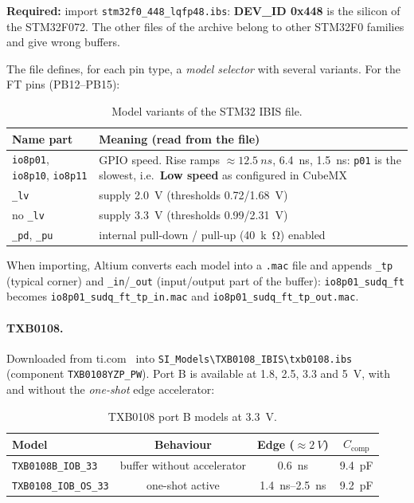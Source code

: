 \documentclass[11pt,a4paper]{article}
\newcommand{\required}[1]{\begin{reqbox}\textbf{\color{reqred}Required:} #1\end{reqbox}}
\begin{document}
\required{import \texttt{stm32f0\_448\_lqfp48.ibs}: \textbf{DEV\_ID 0x448} is the silicon of the
STM32F072. The other files of the archive belong to other STM32F0 families and give
wrong buffers.}

The file defines, for each pin type, a \textit{model selector} with several variants. For the FT pins
(PB12--PB15):

\begin{table}[H]
\centering
\begin{tabular}{l>{\raggedright\arraybackslash}p{}}
\toprule
Name part & Meaning (read from the file) \\
\midrule
\texttt{io8p01}, \texttt{io8p10}, \texttt{io8p11} & GPIO speed. Rise ramps $\approx\qty{12.5}{ns}$, \qty{6.4}{ns}, \qty{1.5}{ns}: \texttt{p01} is the slowest,
i.e.\ \textbf{Low speed} as configured in CubeMX \\
\texttt{\_lv} & supply \qty{2.0}{V} (thresholds 0.72/\qty{1.68}{V}) \\
no \texttt{\_lv} & supply \qty{3.3}{V} (thresholds 0.99/\qty{2.31}{V}) \\
\texttt{\_pd}, \texttt{\_pu} & internal pull-down / pull-up (\qty{40}{k\ohm}) enabled \\
\bottomrule
\end{tabular}
\caption{Model variants of the STM32 IBIS file.}
\label{tab:variants}
\end{table}

{\sloppy When importing, Altium converts each model into a \texttt{.mac} file and appends \texttt{\_tp} (typical
corner) and \texttt{\_in}/\texttt{\_out} (input/output part of the buffer): \texttt{io8p01\_sudq\_ft} becomes
\texttt{io8p01\_sudq\_ft\_tp\_in.mac} and \texttt{io8p01\_sudq\_ft\_tp\_out.mac}.\par}

\paragraph{TXB0108.} Downloaded from ti.com~\cite{tiibis} into \texttt{SI\_Models\textbackslash TXB0108\_IBIS\textbackslash txb0108.ibs} (component
\texttt{TXB0108YZP\_PW}). Port B is available at 1.8, 2.5, 3.3 and \qty{5}{V}, with and without the \textit{one-shot}
edge accelerator:

\begin{table}[H]
\centering
\begin{tabular}{lccc}
\toprule
Model & Behaviour & Edge ($\approx\qty{2}{V}$) & $C_\text{comp}$ \\
\midrule
\texttt{TXB0108B\_IOB\_33} & buffer without accelerator & \qty{0.6}{ns} & \qty{9.4}{pF} \\
\texttt{TXB0108\_IOB\_OS\_33} & one-shot active & \qtyrange{1.4}{2.5}{ns} & \qty{9.2}{pF} \\
\bottomrule
\end{tabular}
\caption{TXB0108 port B models at \qty{3.3}{V}.}
\label{tab:txbmodels}
\end{table}
\end{document}
